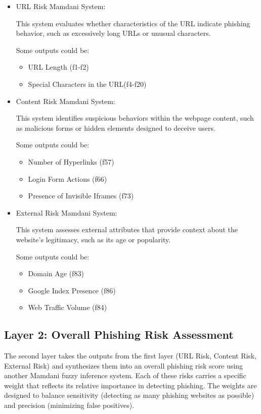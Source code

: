 \documentclass[11pt]{article}
\begin{document}
\begin{itemize}
    \item URL Risk Mamdani System: 
    
    This system evaluates whether characteristics of the URL indicate phishing behavior, such as excessively long URLs or unusual characters.

    Some outputs could be:
    \begin{itemize}
        \item URL Length (f1-f2)
        \item Special Characters in the URL(f4-f20)
    \end{itemize}

    \item Content Risk Mamdani System:
    
    This system identifies suspicious behaviors within the webpage content, such as malicious forms or hidden elements designed to deceive users.

    Some outputs could be:
    \begin{itemize}
        \item Number of Hyperlinks (f57)
        \item Login Form Actions (f66)
        \item Presence of Invisible  Iframes (f73)
    \end{itemize}

    \item External Risk Mamdani System:
    
    This system assesses external attributes that provide context about the website's legitimacy, such as its age or popularity.

    Some outputs could be:
    \begin{itemize}
        \item Domain Age (f83)
        \item Google Index Presence (f86)
        \item Web Traffic Volume (f84)
    \end{itemize}

\end{itemize}

\subsection{Layer 2: Overall Phishing Risk Assessment}

The second layer takes the outputs from the first layer (URL Risk, Content Risk, External Risk) and synthesizes them into an overall phishing risk score using another Mamdani fuzzy inference system. Each of these risks carries a specific weight that reflects its relative importance in detecting phishing. The weights are designed to balance sensitivity (detecting as many phishing websites as possible) and precision (minimizing false positives).
\end{document}
